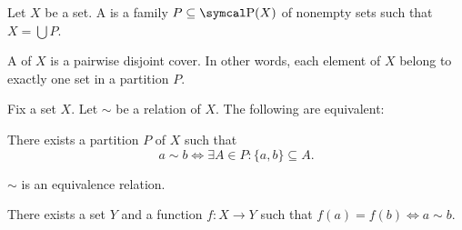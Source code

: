\begin{definition}\label{def:set_partition}
  Let \( X \) be a set. A  is a family \( P \subseteq \Power(X) \) of nonempty sets such that \( X = \bigcup P \).

  A  of \( X \) is a pairwise disjoint cover. In other words, each element of \( X \) belong to exactly one set in a partition \( P \).
\end{definition}

\begin{proposition}\label{thm:equivalence_partition}
  Fix a set \( X \). Let \( \sim \) be a relation of \( X \). The following are equivalent:
  \begin{defenum}
     There exists a partition \( P \) of \( X \) such that
    \begin{equation}\label{thm:equivalence_partition/partition/property}
      a \sim b \iff \exists A \in P: \{ a, b \} \subseteq A.
    \end{equation}

     \( \sim \) is an equivalence relation.

     There exists a set \( Y \) and a function \( f: X \to Y \) such that \( f(a) = f(b) \iff a \sim b \).
  \end{defenum}
\end{proposition}
